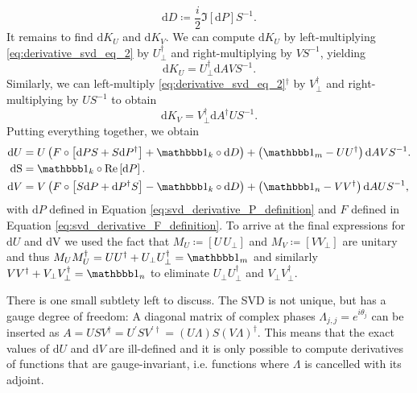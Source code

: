 \begin{equation}
	\text{d}D \coloneqq \frac{i}{2}\Im\left[\text{d}P\right]S^{-1}.
\end{equation}
It remains to find $\text{d}K_U$ and $\text{d}K_V$. We can compute $\text{d}K_U$ by left-multiplying \eqref{eq:derivative_svd_eq_2} by $U_\perp^\dagger$ and right-multiplying by $VS^{-1}$, yielding
\begin{equation}
	\label{eq:derivative_svd_eq_7}
	\text{d}K_U = U_\perp^\dagger \text{d}AVS^{-1}.
\end{equation}
Similarly, we can left-multiply \eqref{eq:derivative_svd_eq_2}$^\dagger$ by $V_\perp^\dagger$ and right-multiplying by $US^{-1}$ to obtain
\begin{equation}
	\label{eq:derivative_svd_eq_8}
	\text{d}K_V = V_\perp^\dagger\text{d}A^\dagger US^{-1}.
\end{equation}
Putting everything together, we obtain
\begin{equation}
	\label{eq:final_solution_svd_derivative}
	\begin{split}
		\text{d}U &= U\left(F\circ\left[\text{d}PS+S\text{d}P^\dagger\right] + \id_k\circ\text{d}D\right) + \left(\id_m-UU^\dagger\right)\text{d}AVS^{-1}. \\
		\text{dS} &= \id_k\circ\Re\left[\text{d}P\right]. \\
		\text{d}V &= V\left(F\circ\left[S\text{d}P+\text{d}P^\dagger S\right] - \id_k\circ\text{d}D\right) + \left(\id_n-VV^\dagger\right)\text{d}AUS^{-1},
	\end{split}
\end{equation}
with $\text{d}P$ defined in Equation \eqref{eq:svd_derivative_P_definition} and $F$ defined in Equation \eqref{eq:svd_derivative_F_definition}. To arrive at the final expressions for $\text{d}U$ and $\text{dV}$ we used the fact that $M_U \coloneqq \left[U\,U_\perp\right]$ and $M_V \coloneqq \left[V V_\perp\right]$ are unitary and thus $M_UM_U^\dagger = UU^\dagger + U_\perp U_\perp^\dagger = \id_m$ and similarly $VV^\dagger + V_\perp V_\perp^\dagger = \id_n$ to eliminate $U_\perp U_\perp^\dagger$ and $V_\perp V_\perp^\dagger$. \par
There is one small subtlety left to discuss. The SVD is not unique, but has a gauge degree of freedom: A diagonal matrix of complex phases $\Lambda_{j,j} = e^{i\theta_j}$ can be inserted as $A = USV^\dagger = U^\prime S V^{\prime\dagger} = (U\Lambda)S(V\Lambda)^\dagger$. This means that the exact values of $\text{d}U$ and $\text{d}V$ are ill-defined and it is only possible to compute derivatives of functions that are gauge-invariant, i.e. functions where $\Lambda$ is cancelled with its adjoint.
%
%
